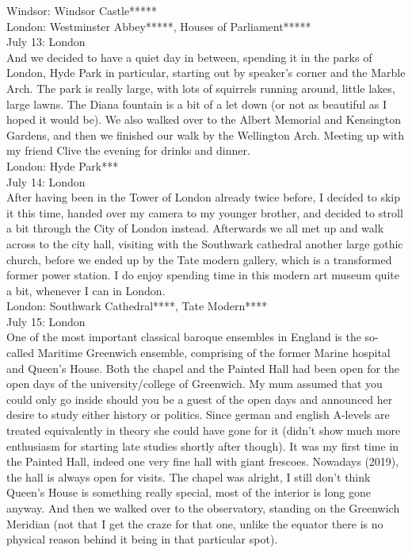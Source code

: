 Windsor: Windsor Castle*****\\
London: Westminster Abbey*****, Houses of Parliament*****\\

July 13: London\\
And we decided to have a quiet day in between, spending it in the parks of London, Hyde Park in particular, starting out by speaker's corner and the Marble Arch. The park is really large, with lots of squirrels running around, little lakes, large lawns. The Diana fountain is a bit of a let down (or not as beautiful as I hoped it would be). We also walked over to the Albert Memorial and Kensington Gardens, and then we finished our walk by the Wellington Arch. Meeting up with my friend Clive the evening for drinks and dinner.\\

London: Hyde Park***\\

July 14: London\\
After having been in the Tower of London already twice before, I decided to skip it this time, handed over my camera to my younger brother, and decided to stroll a bit through the City of London instead. Afterwards we all met up and walk across to the city hall, visiting with the Southwark cathedral another large gothic church, before we ended up by the Tate modern gallery, which is a transformed former power station. I do enjoy spending time in this modern art museum quite a bit, whenever I can in London.\\

London: Southwark Cathedral****,  Tate Modern****\\

July 15: London\\
One of the most important classical baroque ensembles in England is the so-called Maritime Greenwich ensemble, comprising of the former Marine hospital and Queen's House. Both the chapel and the Painted Hall had been open for the open days of the university/college of Greenwich. My mum assumed that you could only go inside should you be a guest of the open days and announced her desire to study either history or politics. Since german and english A-levels are treated equivalently in theory she could have gone for it (didn't show much more enthusiasm for starting late studies shortly after though). It was my first time in the Painted Hall, indeed one very fine hall with giant frescoes. Nowadays (2019), the hall is always open for visits. The chapel was alright, I still don't think Queen's House is something really special, most of the interior is long gone anyway. And then we walked over to the observatory, standing on the Greenwich Meridian (not that I get the craze for that one, unlike the equator there is no physical reason behind it being in that particular spot).\\

